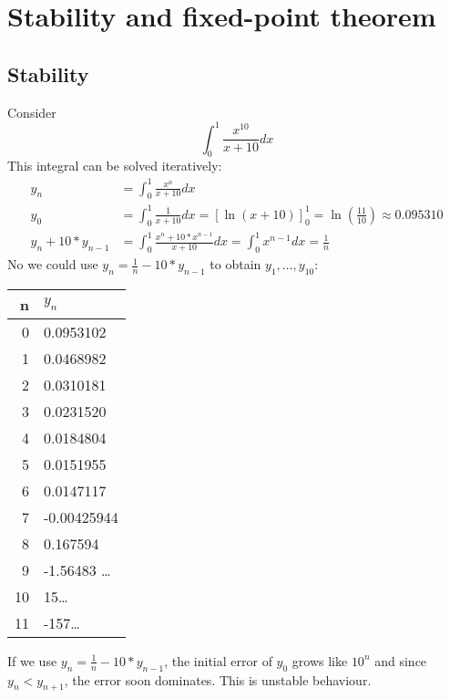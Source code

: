 \chapter{Stability and fixed-point theorem}\label{ch:stability-and-fixed-point-theorem}


\section{Stability}\label{sec:stability}
Consider
\begin{equation*}
    \int_0^1 \frac{x^{10} }{x+10} dx
\end{equation*}
This integral can be solved iteratively:
\begin{align*}
    y_n &= \int_0^1 \frac{x^n}{x+10} dx \\
    y_0 &= \int_0^1 \frac{1}{x+10} dx = \left[ \ln(x+10) \right]^1_0 = \ln\left( \frac{11}{10} \right) \approx 0.095310\\
    y_n + 10 * y_{n-1} &= \int_0^1 \frac{x^n+10*x^{n-1}}{x+10} dx = \int_0^1 x^{n-1} dx = \frac{1}{n}
\end{align*}
No we could use $y_n = \frac{1}{n}- 10 * y_{n-1}$ to obtain $y_1, \ldots{},  y_{10}$:
\begin{center}
    \begin{tabular}{r l}
        \toprule
        n  & $y_n$           \\
        \midrule
        0  & 0.0953102       \\
        1  & 0.0468982       \\
        2  & 0.0310181       \\
        3  & 0.0231520       \\
        4  & 0.0184804       \\
        5  & 0.0151955       \\
        6  & 0.0147117       \\
        7  & -0.00425944     \\
        8  & 0.167594        \\
        9  & -1.56483 \ldots \\
        10 & 15\ldots        \\
        11 & -157\ldots      \\
        \bottomrule
    \end{tabular}
\end{center}
If we use $y_n = \frac{1}{n}- 10 * y_{n-1}$, the initial error of $y_0$ grows like $10^n$ and since $y_n< y_{n+1}$, the error soon dominates.
This is unstable behaviour.

